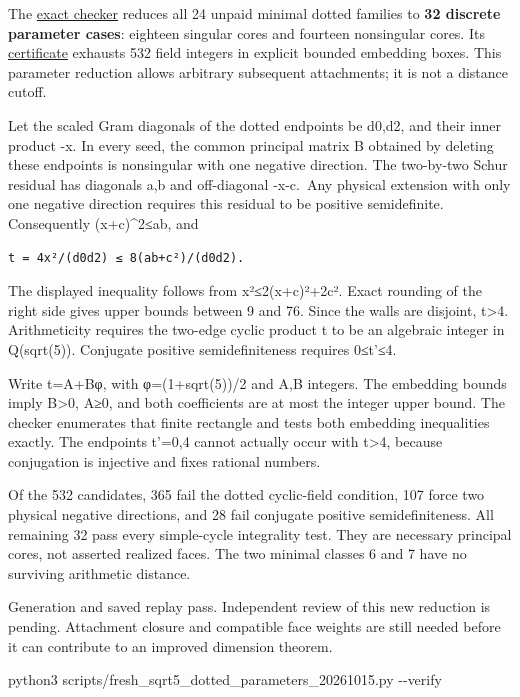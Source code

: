 \documentclass[
  10pt,
]{report}
\newenvironment{Shaded}{}{}
\newcommand{\AttributeTok}[1]{\textcolor[rgb]{0.49,0.56,0.16}{#1}}
\newcommand{\ExtensionTok}[1]{#1}
\newcommand{\NormalTok}[1]{#1}
\begin{document}
The \href{../scripts/fresh_sqrt5_dotted_parameters_20261015.py}{exact
checker} reduces all 24 unpaid minimal dotted families to \textbf{32
discrete parameter cases}: eighteen singular cores and fourteen
nonsingular cores. Its
\href{fresh_sqrt5_dotted_parameters_20261015.json}{certificate} exhausts
532 field integers in explicit bounded embedding boxes. This parameter
reduction allows arbitrary subsequent attachments; it is not a distance
cutoff.

Let the scaled Gram diagonals of the dotted endpoints be d0,d2, and
their inner product -x. In every seed, the common principal matrix B
obtained by deleting these endpoints is nonsingular with one negative
direction. The two-by-two Schur residual has diagonals a,b and
off-diagonal -x-c.~Any physical extension with only one negative
direction requires this residual to be positive semidefinite.
Consequently (x+c)\^{}2≤ab, and

\begin{verbatim}
t = 4x²/(d0d2) ≤ 8(ab+c²)/(d0d2).
\end{verbatim}

The displayed inequality follows from x²≤2(x+c)²+2c². Exact rounding of
the right side gives upper bounds between 9 and 76. Since the walls are
disjoint, t\textgreater4. Arithmeticity requires the two-edge cyclic
product t to be an algebraic integer in Q(sqrt(5)). Conjugate positive
semidefiniteness requires 0≤t'≤4.

Write t=A+Bφ, with φ=(1+sqrt(5))/2 and A,B integers. The embedding
bounds imply B\textgreater0, A≥0, and both coefficients are at most the
integer upper bound. The checker enumerates that finite rectangle and
tests both embedding inequalities exactly. The endpoints t'=0,4 cannot
actually occur with t\textgreater4, because conjugation is injective and
fixes rational numbers.

Of the 532 candidates, 365 fail the dotted cyclic-field condition, 107
force two physical negative directions, and 28 fail conjugate positive
semidefiniteness. All remaining 32 pass every simple-cycle integrality
test. They are necessary principal cores, not asserted realized faces.
The two minimal classes 6 and 7 have no surviving arithmetic distance.

Generation and saved replay pass. Independent review of this new
reduction is pending. Attachment closure and compatible face weights are
still needed before it can contribute to an improved dimension theorem.

\begin{Shaded}
\begin{Highlighting}[]
\ExtensionTok{python3}\NormalTok{ scripts/fresh\_sqrt5\_dotted\_parameters\_20261015.py }\AttributeTok{{-}{-}verify}
\end{Highlighting}
\end{Shaded}
\end{document}
